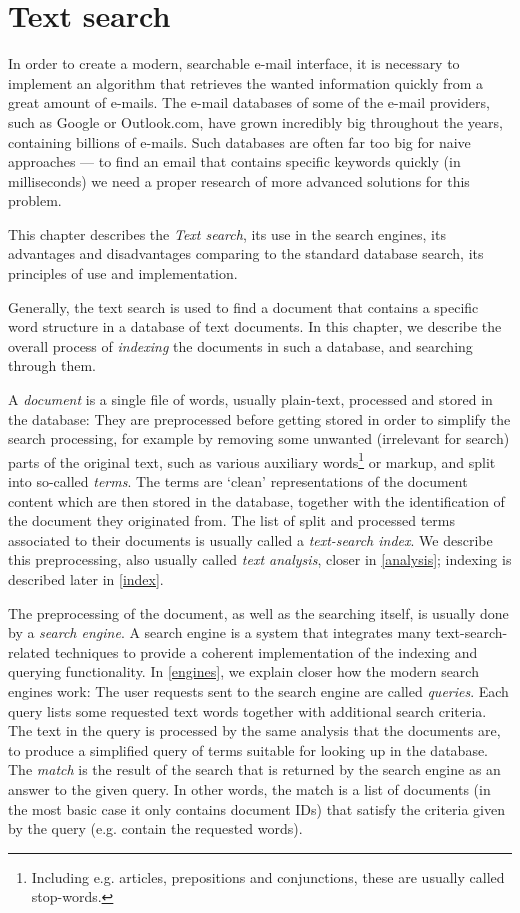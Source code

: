 \chapter{Text search}
\label{textsearch}
In order to create a modern, searchable e-mail interface, it is necessary to implement an algorithm that retrieves the wanted information quickly from a great amount of e-mails. The e-mail databases of some of the e-mail providers, such as Google or Outlook.com, have grown incredibly big throughout the years, containing billions of e-mails. Such databases are often far too big for naive approaches --- to find an email that contains specific keywords quickly (in milliseconds) we need a proper research of more advanced solutions for this problem.

This chapter describes the \emph{Text search}, its use in the search engines, its advantages and disadvantages comparing to the standard database search, its principles of use and implementation. 

Generally, the text search is used to find a document that contains a specific word structure in a database of text documents. In this chapter, we describe the overall process of \emph{indexing} the documents in such a database, and searching through them.

A \emph{document} is a single file of words, usually plain-text, processed and stored in the database: They are preprocessed before getting stored in order to simplify the search processing, for example by removing some unwanted (irrelevant for search) parts of the original text, such as various auxiliary words\footnote{Including e.g. articles, prepositions and conjunctions, these are usually called stop-words.} or markup, and split into so-called \emph{terms}. The terms are `clean' representations of the document content which are then stored in the database, together with the identification of the document they originated from. The list of split and processed terms associated to their documents is usually called a \emph{text-search index}. We describe this preprocessing, also usually called \emph{text analysis}, closer in \autoref{analysis}; indexing is described later in \autoref{index}.

The preprocessing of the document, as well as the searching itself, is usually done by a \emph{search engine}. A search engine is a system that integrates many text-search-related techniques to provide a coherent implementation of the indexing and querying functionality. In \autoref{engines}, we explain closer how the modern search engines work: The user requests sent to the search engine are called \emph{queries}. Each query lists some requested text words together with additional search criteria. The text in the query is processed by the same analysis that the documents are, to produce a simplified query of terms suitable for looking up in the database. The \emph{match} is the result of the search that is returned by the search engine as an answer to the given query. In other words, the match is a list of documents (in the most basic case it only contains document IDs) that
satisfy the criteria given by the query (e.g. contain the requested words).

